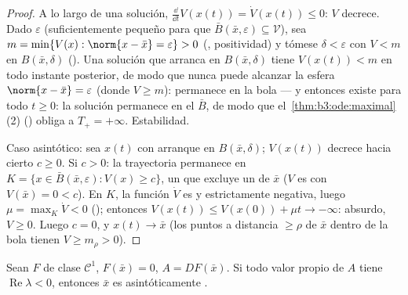 \begin{proof}
A lo largo de una solución, $\frac{\dd}{\dd t}V(x(t)) = \dot V(x(t))
\leq 0$: $V$ decrece. Dado $\varepsilon$ (suficientemente pequeño para
que $\bar B(\bar x, \varepsilon) \subseteq \mathcal V$), sea
$m = \min\{V(x) : \norm{x - \bar x} = \varepsilon\} > 0$
(, positividad) y tómese $\delta < \varepsilon$ con $V < m$ en
$B(\bar x, \delta)$ ().
Una solución que arranca en $B(\bar x, \delta)$ tiene $V(x(t)) < m$ en
todo instante posterior, de modo que nunca puede alcanzar la esfera
$\norm{x -
\bar x} = \varepsilon$ (donde $V \geq m$): permanece en la bola --- y
entonces existe para todo $t \geq 0$: la solución permanece en el
 $\bar B$, de modo que
el~\cref{thm:b3:ode:maximal}(2) () obliga a $T_+ = +\infty$. Estabilidad.

Caso asintótico: sea $x(t)$ con arranque en $B(\bar x, \delta)$;
$V(x(t))$ decrece hacia cierto $c \geq 0$. Si $c > 0$: la trayectoria
permanece en $K = \{x \in \bar B(\bar x,
\varepsilon): V(x) \geq c\}$, un
 que excluye un
 de $\bar x$ ($V$ es
 con $V(\bar x)
= 0 < c$). En $K$, la función $\dot V$ es
 y estrictamente negativa,
luego $\mu = \max_K\dot V < 0$ (); entonces
$V(x(t)) \leq V(x(0)) + \mu t \to
-\infty$: absurdo, $V \geq 0$. Luego $c = 0$, y $x(t) \to \bar x$ (los
puntos a distancia $\geq
\rho$ de $\bar x$ dentro de la bola tienen $V \geq m_\rho >
0$).
\end{proof}

\begin{theorem}
\label{thm:b3:ode:linearization}
Sean $F$ de clase $\mathcal C^1$, $F(\bar x) = 0$, $A = DF(\bar x)$. Si
todo valor propio de $A$ tiene $\operatorname{Re}\lambda <
0$, entonces $\bar x$ es asintóticamente
.
\end{theorem}

